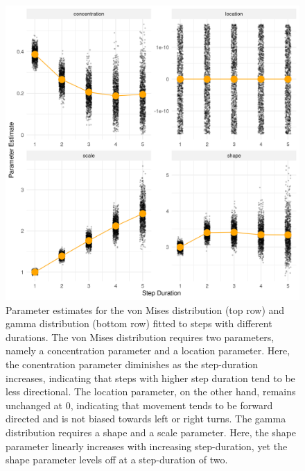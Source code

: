 \documentclass[abstract=on,10pt,a4paper,bibliography=totocnumbered]{article}
\begin{document}
\begin{figure}
  \begin{center}
  \includegraphics[width = \textwidth]{99_DistributionParameters.png}
  \caption{Parameter estimates for the von Mises distribution (top row) and
  gamma distribution (bottom row) fitted to steps with different durations. The
  von Mises distribution requires two parameters, namely a concentration
  parameter and a location parameter. Here, the conentration parameter
  diminishes as the step-duration increases, indicating that steps with higher
  step duration tend to be less directional. The location parameter, on the
  other hand, remains unchanged at 0, indicating that movement tends to be
  forward directed and is not biased towards left or right turns. The gamma
  distribution requires a shape and a scale parameter. Here, the shape parameter
  linearly increases with increasing step-duration, yet the shape parameter
  levels off at a step-duration of two.}
  \label{DistributionParameters}
  \end{center}
\end{figure}
\end{document}
